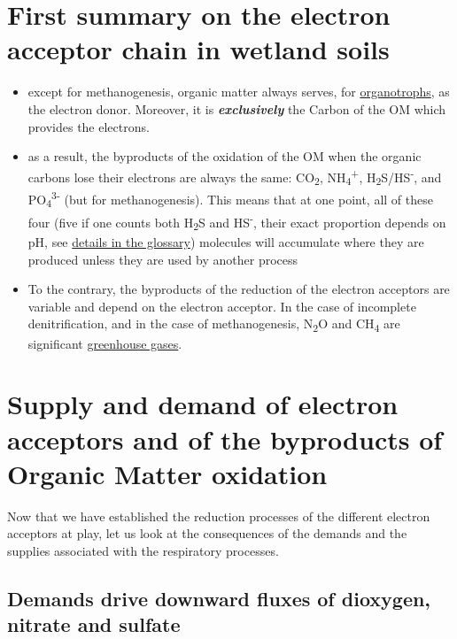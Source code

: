 \documentclass[]{book}
\providecommand{\tightlist}{%
  \setlength{\itemsep}{0pt}\setlength{\parskip}{0pt}}
\theoremstyle{definition}
\theoremstyle{definition}
\theoremstyle{definition}
\theoremstyle{remark}
\begin{document}
\section{First summary on the electron acceptor chain in wetland
soils}\label{first-summary-on-the-electron-acceptor-chain-in-wetland-soils}

\begin{itemize}
\tightlist
\item
  except for methanogenesis, organic matter always serves, for
  \protect\hyperlink{trophic-names}{organotrophs}, as the electron
  donor. Moreover, it is \emph{\textbf{exclusively}} the Carbon of the
  OM which provides the electrons.
\item
  as a result, the byproducts of the oxidation of the OM when the
  organic carbons lose their electrons are always the same:
  CO\textsubscript{2}, NH\textsubscript{4}\textsuperscript{+},
  H\textsubscript{2}S/HS\textsuperscript{-}, and
  PO\textsubscript{4}\textsuperscript{3-} (but for methanogenesis). This
  means that at one point, all of these four (five if one counts both
  H\textsubscript{2}S and HS\textsuperscript{-}, their exact proportion
  depends on pH, see \protect\hyperlink{hydrogen-sulfide}{details in the
  glossary}) molecules will accumulate where they are produced unless
  they are used by another process
\item
  To the contrary, the byproducts of the reduction of the electron
  acceptors are variable and depend on the electron acceptor. In the
  case of incomplete denitrification, and in the case of methanogenesis,
  N\textsubscript{2}O and CH\textsubscript{4} are significant
  \protect\hyperlink{GHG}{greenhouse gases}.
\end{itemize}

\section{Supply and demand of electron acceptors and of the byproducts
of Organic Matter
oxidation}\label{supply-and-demand-of-electron-acceptors-and-of-the-byproducts-of-organic-matter-oxidation}

Now that we have established the reduction processes of the different
electron acceptors at play, let us look at the consequences of the
demands and the supplies associated with the respiratory processes.

\subsection{Demands drive downward fluxes of dioxygen, nitrate and
sulfate}\label{demands-drive-downward-fluxes-of-dioxygen-nitrate-and-sulfate}
\end{document}
